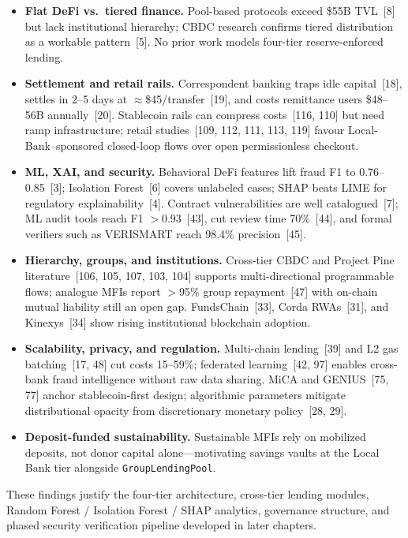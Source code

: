 \documentclass[12pt, a4paper]{report}
\begin{document}
\begin{itemize}[noitemsep]
\item \textbf{Flat DeFi vs.\ tiered finance.} Pool-based protocols exceed \$55B TVL~[8] but lack institutional hierarchy; CBDC research confirms tiered distribution as a workable pattern~[5]. No prior work models four-tier reserve-enforced lending.
\item \textbf{Settlement and retail rails.} Correspondent banking traps idle capital~[18], settles in 2--5 days at $\approx$\$45/transfer~[19], and costs remittance users \$48--56B annually~[20]. Stablecoin rails can compress costs~[116, 110] but need ramp infrastructure; retail studies~[109, 112, 111, 113, 119] favour Local-Bank--sponsored closed-loop flows over open permissionless checkout.
\item \textbf{ML, XAI, and security.} Behavioral DeFi features lift fraud F1 to 0.76--0.85~[3]; Isolation Forest~[6] covers unlabeled cases; SHAP beats LIME for regulatory explainability~[4]. Contract vulnerabilities are well catalogued~[7]; ML audit tools reach F1 $>$0.93~[43], cut review time 70\%~[44], and formal verifiers such as VERISMART reach 98.4\% precision~[45].
\item \textbf{Hierarchy, groups, and institutions.} Cross-tier CBDC and Project Pine literature~[106, 105, 107, 103, 104] supports multi-directional programmable flows; analogue MFIs report $>$95\% group repayment~[47] with on-chain mutual liability still an open gap. FundsChain~[33], Corda RWAs~[31], and Kinexys~[34] show rising institutional blockchain adoption.
\item \textbf{Scalability, privacy, and regulation.} Multi-chain lending~[39] and L2 gas batching~[17, 48] cut costs 15--59\%; federated learning~[42, 97] enables cross-bank fraud intelligence without raw data sharing. MiCA and GENIUS~[75, 77] anchor stablecoin-first design; algorithmic parameters mitigate distributional opacity from discretionary monetary policy~[28, 29].
\item \textbf{Deposit-funded sustainability.} Sustainable MFIs rely on mobilized deposits, not donor capital alone---motivating savings vaults at the Local Bank tier alongside \texttt{GroupLendingPool}.
\end{itemize}

These findings justify the four-tier architecture, cross-tier lending modules, Random Forest / Isolation Forest / SHAP analytics, governance structure, and phased security verification pipeline developed in later chapters.
\end{document}
